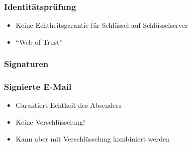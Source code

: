 \begin{frame}
  \frametitle{Identitätsprüfung}
  \begin{itemize}
    \item Keine Echtheitsgarantie für Schlüssel auf Schlüsselserver
    \item ``Web of Trust''
  \end{itemize}
  \center {}
\end{frame}

\begin{frame}
  \frametitle{Signaturen}
  \center {}
\end{frame}

\begin{frame}
  \frametitle{Signierte E-Mail}
  \begin{itemize}
    \item Garantiert Echtheit des Absenders
    \item Keine Verschlüsselung!
    \item Kann aber mit Verschlüsselung kombiniert werden
  \end{itemize}
\end{frame}

